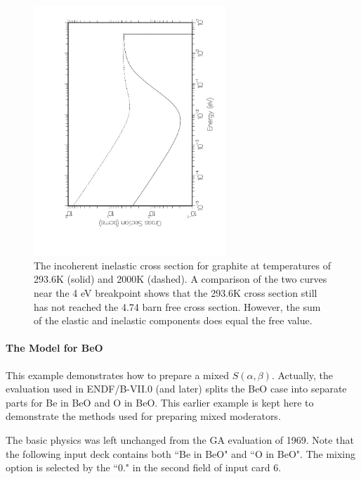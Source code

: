 \begin{figure}[t]\centering
\includegraphics[keepaspectratio, height=3.7in, angle=270]{figs/leiiack}
\caption[Incoherent elastic scattering cross section for graphite]{The
 incoherent inelastic cross section for graphite at temperatures of
 293.6K (solid) and 2000K (dashed).  A comparison of the two curves
 near the 4 eV breakpoint shows that the 293.6K cross section still has
 not reached the 4.74 barn free cross section.  However, the sum of the
 elastic and inelastic components does equal the free value.}
\label{gii}
\end{figure}

\paragraph{The Model for BeO}
This example demonstrates how to prepare a mixed $S(\alpha,\beta)$.
Actually, the evaluation used in ENDF/B-VII.0 (and
later) splits the BeO case into separate parts for Be in BeO and O in BeO.
This earlier example is kept here to demonstrate the methods used
for preparing mixed moderators.

The basic physics was left unchanged from the GA evaluation
of 1969\cite{GAreport}.  Note that the following input deck contains both
``Be in BeO" and ``O in BeO".  The mixing option is selected by
the ``0." in the second field of input card 6.


